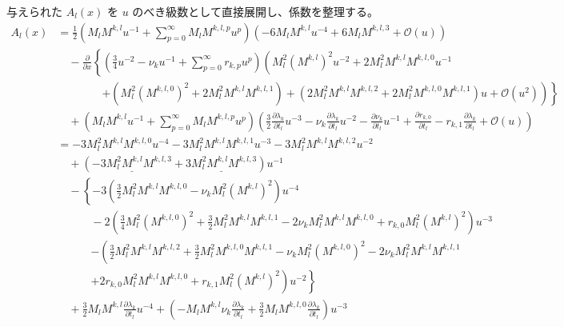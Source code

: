 \documentclass[paper=a4, fontsize=11pt]{jlreq} %
\theoremstyle{break}
\theoremstyle{qa}
\begin{document}
与えられた $A_l(x)$ を $u$ のべき級数として直接展開し、係数を整理する。
\begin{align*}
    A_l(x) &= \frac{1}{2} \left( M_l M^{k,l} u^{-1} + \sum_{p=0}^\infty M_l M^{k,l,p} u^p \right) \left( -6 M_l M^{k,l} u^{-4} + 6 M_l M^{k,l,3} + \mathcal{O}(u) \right) \\
    &\quad - \frac{\partial}{\partial x} \left\{ \left( \frac{3}{4} u^{-2} - \nu_k u^{-1} + \sum_{p=0}^\infty r_{k,p} u^p \right) \left( M_l^2 (M^{k,l})^2 u^{-2} + 2M_l^2 M^{k,l} M^{k,l,0} u^{-1} \right. \right. \\
    &\hspace{4em} \left. \left. + (M_l^2(M^{k,l,0})^2 + 2M_l^2 M^{k,l} M^{k,l,1}) + (2M_l^2 M^{k,l} M^{k,l,2} + 2M_l^2 M^{k,l,0} M^{k,l,1}) u + \mathcal{O}(u^2) \right) \right\} \\
    &\quad + \left( M_l M^{k,l} u^{-1} + \sum_{p=0}^\infty M_l M^{k,l,p} u^p \right) \left( \frac{3}{2} \frac{\partial \lambda_k}{\partial t_l} u^{-3} - \nu_k \frac{\partial \lambda_k}{\partial t_l} u^{-2} - \frac{\partial \nu_k}{\partial t_l} u^{-1} + \frac{\partial r_{k,0}}{\partial t_l} - r_{k,1}\frac{\partial \lambda_{k}}{\partial t_l} + \mathcal{O}(u) \right) \\
    &= -3 M_l^2 M^{k,l} M^{k,l,0} u^{-4} - 3 M_l^2 M^{k,l} M^{k,l,1} u^{-3} - 3 M_l^2 M^{k,l} M^{k,l,2} u^{-2} \\
    &\quad + \left( \underline{-3 M_l^2 M^{k,l} M^{k,l,3}} + \underline{3 M_l^2 M^{k,l} M^{k,l,3}} \right) u^{-1} \\
    &\quad - \left\{ -3 \left( \frac{3}{2} M_l^2 M^{k,l} M^{k,l,0} - \nu_k M_l^2 (M^{k,l})^2 \right) u^{-4} \right. \\
    &\hspace{3em} - 2 \left( \frac{3}{4} M_l^2 (M^{k,l,0})^2 + \frac{3}{2} M_l^2 M^{k,l} M^{k,l,1} - 2\nu_k M_l^2 M^{k,l} M^{k,l,0} + r_{k,0} M_l^2 (M^{k,l})^2 \right) u^{-3} \\
    &\hspace{3em} \left. - \left( \frac{3}{2} M_l^2 M^{k,l} M^{k,l,2} + \frac{3}{2} M_l^2 M^{k,l,0} M^{k,l,1} - \nu_k M_l^2 (M^{k,l,0})^2 - 2\nu_k M_l^2 M^{k,l} M^{k,l,1} \right. \right.\\
    &\hspace{3em}\left. \left.+ 2 r_{k,0} M_l^2 M^{k,l} M^{k,l,0} + r_{k,1} M_l^2 (M^{k,l})^2 \right) u^{-2} \right\} \\
    &\quad + \frac{3}{2} M_l M^{k,l} \frac{\partial \lambda_k}{\partial t_l} u^{-4} + \left( - M_l M^{k,l} \nu_k \frac{\partial \lambda_k}{\partial t_l} + \frac{3}{2} M_l M^{k,l,0} \frac{\partial \lambda_k}{\partial t_l} \right) u^{-3} \\

\end{align*}
\end{document}
